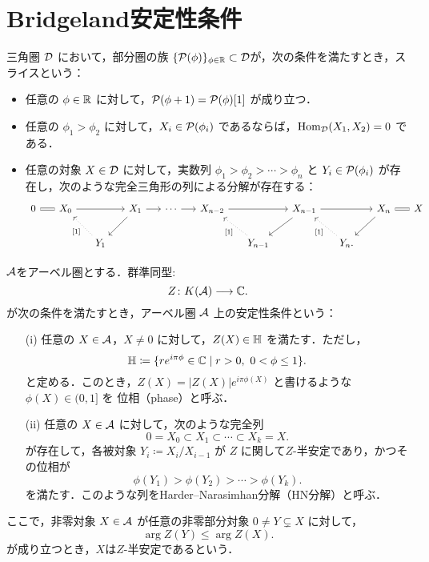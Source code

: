 \section{Bridgeland安定性条件}
\begin{defn}\cite{Bri07}
三角圏 $\D$ において，部分圏の族 $\{ \P(\phi) \}_{\phi \in \RR} \subset \D$が，次の条件を満たすとき，スライスという：
\begin{itemize}
  \item 任意の $\phi \in \RR$ に対して，$\P(\phi + 1) = \P(\phi)[1]$ が成り立つ．
  \item 任意の $\phi_1 > \phi_2$ に対して，$X_i \in \P(\phi_i)$ であるならば，$\Hom_{\D}(X_1, X_2) = 0$ である．
  \item 任意の対象 $X \in \D$ に対して，実数列 $\phi_1 > \phi_2 > \cdots > \phi_n$ と $Y_i \in \P(\phi_i)$ が存在し，次のような完全三角形の列による分解が存在する：
  \[
    \begin{tikzcd}[column sep=1.5em]
      0 \ar[r, equal] & X_0 \ar[rr] && X_1 \ar[r] \ar[ld] & \cdots \ar[r] & X_{n-2} \ar[rr] && X_{n-1} \ar[ld] \ar[rr] && X_n \ar[ld] \ar[r, equal] & X \\
      && Y_1 \ar[lu, dotted,swap, "{[1]}"'] &&&& Y_{n-1} \ar[lu, dotted,swap, "{[1]}"'] && Y_n \ar[lu, dotted,swap, "{[1]}"'].
    \end{tikzcd}
  \]
\end{itemize}
\end{defn}


\begin{defn}\cite{Bri07}
$\A$をアーベル圏とする．群準同型:
\[
  Z \colon K(\A) \longrightarrow \CC.
\]
が次の条件を満たすとき，アーベル圏 $\A$ 上の安定性条件という：
\begin{itemize}
  \item[(i)] 任意の $X \in \A$，$X \neq 0$ に対して，$Z(X) \in \HH$ を満たす．ただし，
  \[
    \HH \coloneqq \{ re^{i\pi\phi} \in \CC \mid r > 0,\ 0 < \phi \le 1 \}.
  \]
  と定める．このとき，$Z(X) = |Z(X)|e^{i\pi\phi(X)}$ と書けるような $\phi(X) \in (0,1]$ を
  位相（phase）と呼ぶ．
  
  \item[(ii)] 任意の $X \in \A$ に対して，次のような完全列
  \[
    0 = X_0 \subset X_1 \subset \cdots \subset X_k = X.
  \]
  が存在して，各被対象 $Y_i \coloneqq X_i / X_{i-1}$ が $Z$ に関して$Z$-半安定であり，かつその位相が
  \[
    \phi(Y_1) > \phi(Y_2) > \cdots > \phi(Y_k).
  \]
  を満たす．このような列をHarder--Narasimhan分解（HN分解）と呼ぶ．
\end{itemize}

ここで，非零対象 $X \in \A$ が任意の非零部分対象 $0 \neq Y \subsetneq X$ に対して，
\[
  \arg Z(Y) \le \arg Z(X).
\]
が成り立つとき，$X$は$Z$-半安定であるという．
\end{defn}

